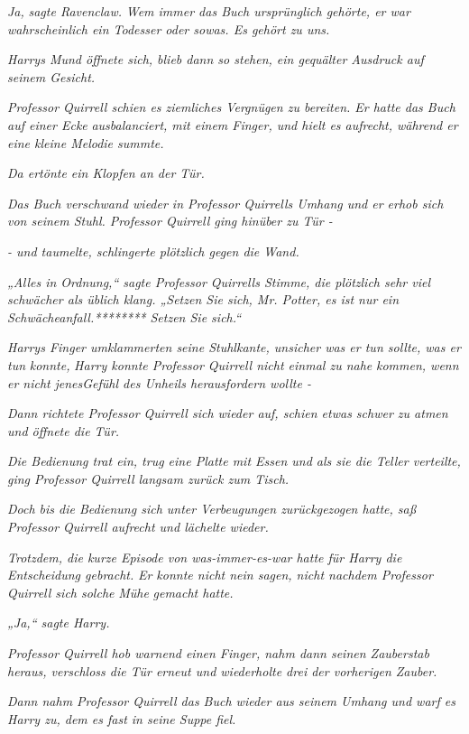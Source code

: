 {\emph{Ja,} \emph{sagte Ravenclaw.} \emph{\emph{Wem immer das Buch ursprünglich gehörte, er war wahrscheinlich ein Todesser oder sowas. Es gehört zu uns.}}

\emph{Harrys Mund öffnete sich, blieb dann so stehen, ein gequälter Ausdruck auf seinem Gesicht.}

\emph{Professor Quirrell schien es ziemliches Vergnügen zu bereiten. Er hatte das Buch auf einer Ecke} \emph{ausbalanciert, mit einem Finger, und hielt es aufrecht, während er eine kleine Melodie summte.}

\emph{Da ertönte ein Klopfen an der Tür.}

\emph{Das Buch verschwand wieder in Professor Quirrells Umhang und er erhob sich von seinem Stuhl. Professor Quirrell ging hinüber zu Tür -}

\emph{- und taumelte, schlingerte plötzlich gegen die Wand.}

\emph{„Alles in Ordnung,“ sagte Professor Quirrells Stimme, die plötzlich sehr viel schwächer als üblich klang. „Setzen Sie sich, Mr. Potter, es ist nur ein Schwächeanfall.******** Setzen Sie sich.“}

\emph{Harrys Finger umklammerten seine Stuhlkante, unsicher was er tun sollte, was er tun} \emph{\emph{konnte,}} \emph{Harry konnte Professor Quirrell nicht einmal zu nahe} \emph{kommen, wenn er nicht} \emph{jenesGefühl des Unheils herausfordern wollte -}

\emph{Dann richtete Professor Quirrell sich wieder auf, schien etwas schwer zu atmen und öffnete die Tür.}

\emph{Die Bedienung trat ein, trug eine Platte mit Essen und als sie die Teller verteilte, ging Professor Quirrell langsam zurück zum Tisch.}

\emph{Doch bis die Bedienung sich unter Verbeugungen zurückgezogen hatte, saß Professor Quirrell aufrecht und lächelte wieder.}

\emph{Trotzdem, die kurze Episode von was-immer-es-war hatte für Harry die Entscheidung gebracht.} \emph{Er konnte nicht nein sagen, nicht nachdem Professor Quirrell sich solche} \emph{Mühe} \emph{gemacht hatte.}

\emph{„Ja,“ sagte Harry.}

\emph{Professor Quirrell hob warnend einen Finger, nahm dann seinen Zauberstab heraus, verschloss die Tür erneut und wiederholte drei der vorherigen Zauber.}

\emph{Dann nahm Professor Quirrell das Buch wieder aus seinem Umhang und warf es Harry zu, dem es fast in seine Suppe fiel.}

}
